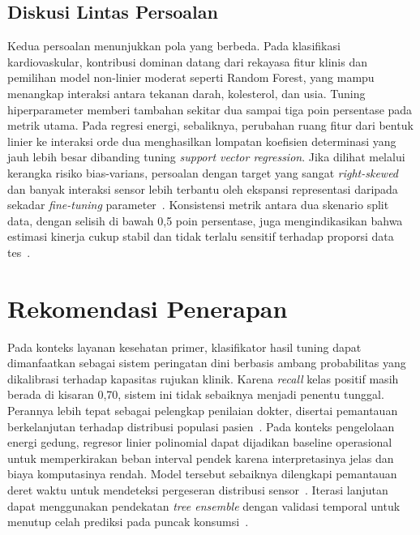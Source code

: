 \documentclass[conference]{IEEEtran}
\begin{document}
\subsection{Diskusi Lintas Persoalan}
Kedua persoalan menunjukkan pola yang berbeda. Pada klasifikasi kardiovaskular, kontribusi dominan datang dari rekayasa fitur klinis dan pemilihan model non-linier moderat seperti Random Forest, yang mampu menangkap interaksi antara tekanan darah, kolesterol, dan usia. Tuning hiperparameter memberi tambahan sekitar dua sampai tiga poin persentase pada metrik utama. Pada regresi energi, sebaliknya, perubahan ruang fitur dari bentuk linier ke interaksi orde dua menghasilkan lompatan koefisien determinasi yang jauh lebih besar dibanding tuning \textit{support vector regression}. Jika dilihat melalui kerangka risiko bias-varians, persoalan dengan target yang sangat \textit{right-skewed} dan banyak interaksi sensor lebih terbantu oleh ekspansi representasi daripada sekadar \textit{fine-tuning} parameter~\cite{Hastie2009,Raschka2018}. Konsistensi metrik antara dua skenario split data, dengan selisih di bawah 0{,}5 poin persentase, juga mengindikasikan bahwa estimasi kinerja cukup stabil dan tidak terlalu sensitif terhadap proporsi data tes~\cite{Varoquaux2017}.

\section{Rekomendasi Penerapan}
Pada konteks layanan kesehatan primer, klasifikator hasil tuning dapat dimanfaatkan sebagai sistem peringatan dini berbasis ambang probabilitas yang dikalibrasi terhadap kapasitas rujukan klinik. Karena \textit{recall} kelas positif masih berada di kisaran 0{,}70, sistem ini tidak sebaiknya menjadi penentu tunggal. Perannya lebih tepat sebagai pelengkap penilaian dokter, disertai pemantauan berkelanjutan terhadap distribusi populasi pasien~\cite{Ahmed2022,Naser2023}. Pada konteks pengelolaan energi gedung, regresor linier polinomial dapat dijadikan baseline operasional untuk memperkirakan beban interval pendek karena interpretasinya jelas dan biaya komputasinya rendah. Model tersebut sebaiknya dilengkapi pemantauan deret waktu untuk mendeteksi pergeseran distribusi sensor~\cite{Bourdeau2019,Somu2021,Wei2023Energy}. Iterasi lanjutan dapat menggunakan pendekatan \textit{tree ensemble} dengan validasi temporal untuk menutup celah prediksi pada puncak konsumsi~\cite{Zhao2022Energy}.
\end{document}
